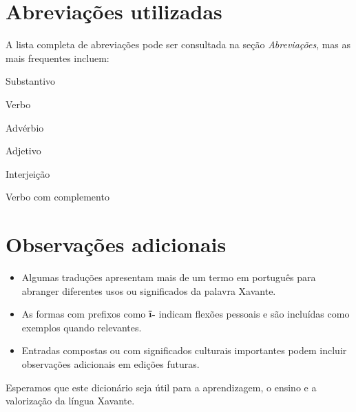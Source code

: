 \section*{Abreviações utilizadas}

A lista completa de abreviações pode ser consultada na seção \textit{Abreviações}, mas as mais frequentes incluem:

\begin{description}[leftmargin=3cm, style=multiline]
  \item[s.] Substantivo
  \item[v.] Verbo
  \item[adv.] Advérbio
  \item[adj.] Adjetivo
  \item[intj.] Interjeição
  \item[vc.] Verbo com complemento
\end{description}

\section*{Observações adicionais}

\begin{itemize}
  \item Algumas traduções apresentam mais de um termo em português para abranger diferentes usos ou significados da palavra Xavante.
  \item As formas com prefixos como \textbf{ĩ-} indicam flexões pessoais e são incluídas como exemplos quando relevantes.
  \item Entradas compostas ou com significados culturais importantes podem incluir observações adicionais em edições futuras.
\end{itemize}

Esperamos que este dicionário seja útil para a aprendizagem, o ensino e a valorização da língua Xavante.